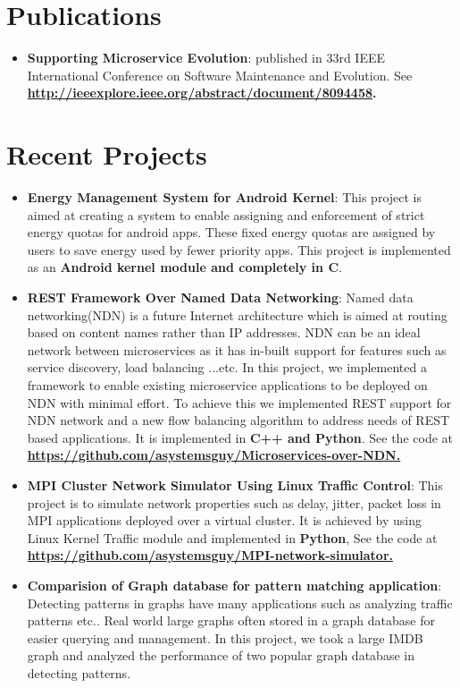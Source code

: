 \documentclass[letterpaper,11pt]{article}
\newcommand{\resumeItem}[2]{
  \item\small{
    \textbf{#1}{: #2 \vspace{-2pt}}
  }
}
\newcommand{\resumeSubItem}[2]{\resumeItem{#1}{#2}\vspace{-4pt}}
\newcommand{\resumeSubHeadingListStart}{\begin{itemize}[leftmargin=*]}
\newcommand{\resumeSubHeadingListEnd}{\end{itemize}}
\begin{document}
\section{Publications}
  \resumeSubHeadingListStart
    \resumeSubItem {Supporting Microservice Evolution} {published in 33rd IEEE International Conference on Software Maintenance and Evolution. 
    See \textbf{\href{http://ieeexplore.ieee.org/abstract/document/8094458}{http://ieeexplore.ieee.org/abstract/document/8094458}.}
    }
  \resumeSubHeadingListEnd

\section{Recent Projects}
  \resumeSubHeadingListStart
    \resumeSubItem{Energy Management System for Android Kernel}
      {This project is aimed at creating a system to enable assigning and enforcement of strict energy quotas for android apps. 
      These fixed energy quotas are assigned by users to save energy used by fewer priority apps.
      This project is implemented as an \textbf{Android kernel module and completely in C}.}
    \resumeSubItem{REST Framework Over Named Data Networking}
      {Named data networking(NDN) is a future Internet architecture which is aimed at routing based on content names rather than IP addresses. 
       NDN can be an ideal network between microservices as it has in-built support for features such as service discovery, load balancing ...etc. 
       In this project, we implemented a framework to enable existing microservice applications to be deployed on NDN with minimal effort.
       To achieve this we implemented REST support for NDN network and a new flow balancing algorithm to address needs of REST based applications.
       It is implemented in \textbf{C++ and Python}. 
       See the code at \textbf{\href{https://github.com/asystemsguy/Microservices-over-NDN}{https://github.com/asystemsguy/Microservices-over-NDN.}}
      }
    \resumeSubItem{MPI Cluster Network Simulator Using Linux Traffic Control}
      {This project is to simulate network properties such as delay, jitter, packet loss in MPI applications deployed over a virtual cluster.
       It is achieved by using Linux Kernel Traffic module and implemented in \textbf{Python}, 
       See the code at \textbf{\href{ https://github.com/asystemsguy/MPI-network-simulator}{https://github.com/asystemsguy/MPI-network-simulator.}}}
    \resumeSubItem{Comparision of Graph database for pattern matching application}
      {Detecting patterns in graphs have many applications such as analyzing traffic patterns etc.. Real world large graphs often stored in a graph database for easier querying and management. In this project, we took a large IMDB graph and analyzed the performance of two popular graph database in detecting patterns.}
 \resumeSubHeadingListEnd
\end{document}
